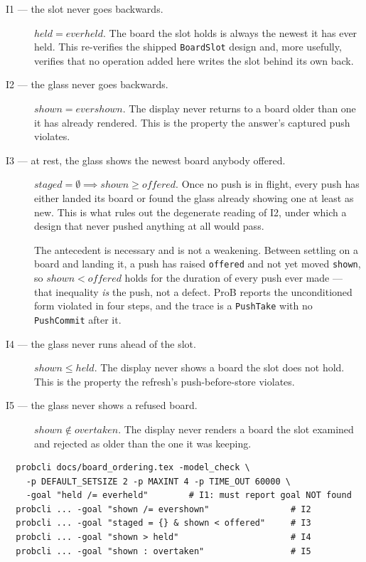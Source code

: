 \documentclass[a4paper,10pt,fleqn]{article}
\begin{document}
\begin{description}
  \item[I1 --- the slot never goes backwards.] $held = everheld$. The board the
    slot holds is always the newest it has ever held. This re-verifies the
    shipped \texttt{BoardSlot} design and, more usefully, verifies that no
    operation added here writes the slot behind its own back.
  \item[I2 --- the glass never goes backwards.] $shown = evershown$. The display
    never returns to a board older than one it has already rendered. This is the
    property the answer's captured push violates.
  \item[I3 --- at rest, the glass shows the newest board anybody offered.]
    $staged = \emptyset \implies shown \geq offered$. Once no push is in flight,
    every push has either landed its board or found the glass already showing
    one at least as new. This is what rules out the degenerate reading of I2,
    under which a design that never pushed anything at all would pass.

    The antecedent is necessary and is not a weakening. Between settling on a
    board and landing it, a push has raised \texttt{offered} and not yet moved
    \texttt{shown}, so $shown < offered$ holds for the duration of every push
    ever made --- that inequality \emph{is} the push, not a defect. ProB reports
    the unconditioned form violated in four steps, and the trace is a
    \texttt{PushTake} with no \texttt{PushCommit} after it.
  \item[I4 --- the glass never runs ahead of the slot.] $shown \leq held$. The
    display never shows a board the slot does not hold. This is the property the
    refresh's push-before-store violates.
  \item[I5 --- the glass never shows a refused board.]
    $shown \notin overtaken$. The display never renders a board the slot
    examined and rejected as older than the one it was keeping.
\end{description}

\begin{verbatim}
  probcli docs/board_ordering.tex -model_check \
    -p DEFAULT_SETSIZE 2 -p MAXINT 4 -p TIME_OUT 60000 \
    -goal "held /= everheld"        # I1: must report goal NOT found
  probcli ... -goal "shown /= evershown"                # I2
  probcli ... -goal "staged = {} & shown < offered"     # I3
  probcli ... -goal "shown > held"                      # I4
  probcli ... -goal "shown : overtaken"                 # I5
\end{verbatim}
\end{document}
